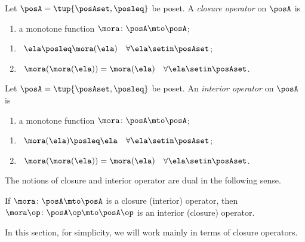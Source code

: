 \begin{ctdefinition}\label{def:closure-operator}
    Let $\posA = \tup{\posAset, \posleq}$ be poset.
    A \emph{closure operator} on $\posA$ is

    \constit
    \begin{enumerate}
        \item a monotone function $\mora \colon \posA \mto \posA$;
    \end{enumerate}

    \condit
    \begin{enumerate}
        \item {} \ $\ela \posleq \mora(\ela) \quad \forall \ela \setin \posAset$;
        \item {} \ $\mora (\mora(\ela)) = \mora(\ela) \quad \forall \ela \setin \posAset$.
    \end{enumerate}
\end{ctdefinition}

\begin{ctdefinition}\label{def:interior-operator}
    Let $\posA = \tup{\posAset, \posleq}$ be poset.
    An \emph{interior operator} on $\posA$ is

    \constit
    \begin{enumerate}
        \item a monotone function $\mora \colon \posA \mto \posA$;
    \end{enumerate}

    \condit
    \begin{enumerate}
        \item {} \ $\mora(\ela) \posleq \ela \quad \forall \ela \setin \posAset$;
        \item {} \ $\mora (\mora(\ela)) = \mora(\ela) \quad \forall \ela \setin \posAset$.
    \end{enumerate}
\end{ctdefinition}

The notions of closure and interior operator are dual in the following sense.

\begin{lemma}\label{lem:fca-opposites-of-closure-operators}
    If $\mora \colon \posA \mto \posA$ is a closure (interior) operator, then $\mora\op \colon \posA\op \mto \posA\op$ is an interior (closure) operator.
\end{lemma}

In this section, for simplicity, we will work mainly in terms of closure operators.

